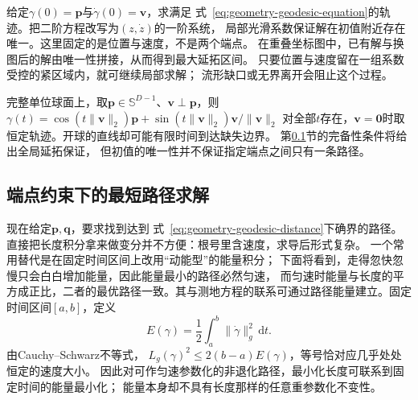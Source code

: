 给定$\gamma(0)=\bm p$与$\dot\gamma(0)=\bm v$，求满足
式~\eqref{eq:geometry-geodesic-equation}的轨迹。把二阶方程改写为$(z,\dot z)$的一阶系统，
局部光滑系数保证解在初值附近存在唯一。这里固定的是位置与速度，不是两个端点。
在重叠坐标图中，已有解与换图后的解由唯一性拼接，从而得到最大延拓区间。
只要位置与速度留在一组系数受控的紧区域内，就可继续局部求解；
流形缺口或无界离开会阻止这个过程。

完整单位球面上，取$\bm p\in\mathbb S^{D-1}$、$\bm v\perp\bm p$，则
$\gamma(t)=\cos(t\lVert\bm v\rVert_2)\bm p
+\sin(t\lVert\bm v\rVert_2)\bm v/\lVert\bm v\rVert_2$
对全部$t$存在，$\bm v=\bm0$时取恒定轨迹。开球的直线却可能有限时间到达缺失边界。
第\ref{sec:geometry-endpoint-minimizing-path}节的完备性条件将给出全局延拓保证，
但初值的唯一性并不保证指定端点之间只有一条路径。

\subsection{端点约束下的最短路径求解}
\label{sec:geometry-endpoint-minimizing-path}

现在给定$\bm p,\bm q$，要求找到达到
式~\eqref{eq:geometry-geodesic-distance}下确界的路径。
直接把长度积分拿来做变分并不方便：根号里含速度，求导后形式复杂。
一个常用替代是在固定时间区间上改用“动能型”的能量积分；
下面将看到，走得忽快忽慢只会白白增加能量，因此能量最小的路径必然匀速，
而匀速时能量与长度的平方成正比，二者的最优路径一致。其与测地方程的联系可通过路径能量建立。固定时间区间$[a,b]$，定义
\[
 E(\gamma)=\frac12\int_a^b\lVert\dot\gamma\rVert_g^2\,\mathrm dt.
\]
由Cauchy--Schwarz不等式，
$L_g(\gamma)^2\leq2(b-a)E(\gamma)$，等号恰对应几乎处处恒定的速度大小。
因此对可作匀速参数化的非退化路径，最小化长度可联系到固定时间的能量最小化；
能量本身却不具有长度那样的任意重参数化不变性。

